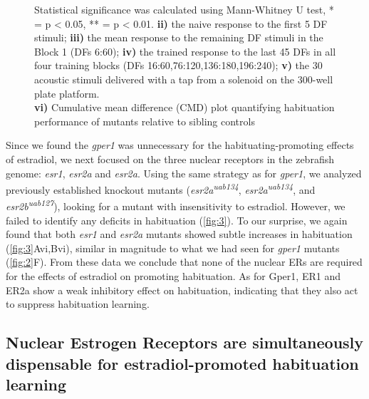 \documentclass[9pt,lineno]{RandlettLab_elife}
\begin{document}
{\begin{figure}
\begin{fullwidth}
\begin{center}
{Statistical significance was calculated using Mann-Whitney U test, * = p < 0.05, ** = p < 0.01.
\textbf{ii)} the naive response to the first 5 DF stimuli; \textbf{iii)} the mean response to the remaining DF stimuli in the Block 1 (DFs 6:60); \textbf{iv)} the trained response to the last 45 DFs in all four training blocks (DFs 16:60,76:120,136:180,196:240); \textbf{v)} the 30 acoustic stimuli delivered with a tap from a solenoid on the 300-well plate platform.
\\ \textbf{vi)} Cumulative mean difference (CMD) plot quantifying habituation performance of mutants relative to sibling controls
}

\label{fig:3}

\end{center}
\end{fullwidth}
\end{figure}

Since we found the \emph{gper1} was unnecessary for the habituating-promoting effects of estradiol, we next focused on the three nuclear receptors in the zebrafish genome: \emph{esr1}, \emph{esr2a} and \emph{esr2a}. 
Using the same strategy as for \emph{gper1}, we analyzed previously established knockout mutants (\emph{esr2a\textsuperscript{uab134}}, \emph{esr2a\textsuperscript{uab134}}, and \emph{esr2b\textsuperscript{uab127}}), looking for a mutant with insensitivity to estradiol. 
However, we failed to identify any deficits in habituation (\autoref{fig:3}).
To our surprise, we again found that both \emph{esr1} and \emph{esr2a} mutants showed subtle increases in habituation (\autoref{fig:3}Avi,Bvi), similar in magnitude to what we had seen for \emph{gper1} mutants (\autoref{fig:2}F). 
From these data we conclude that none of the nuclear ERs are required for the effects of estradiol on promoting habituation. As for Gper1, ER1 and ER2a show a weak inhibitory effect on habituation, indicating that they also act to suppress habituation learning.

\subsection{Nuclear Estrogen Receptors are simultaneously dispensable for estradiol-promoted habituation learning}

}
\end{document}
